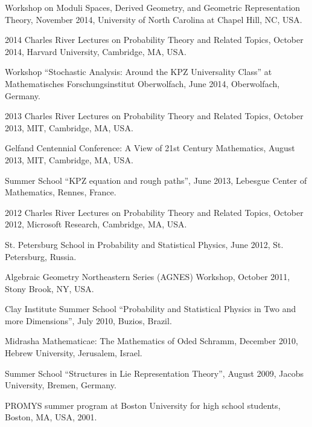 \documentclass[letterpaper,11pt]{article}
\begin{document}
\begin{etaremune}
	\item
	      Workshop on Moduli Spaces, Derived Geometry, and Geometric
	      Representation Theory, November 2014, University of North Carolina at Chapel
	      Hill, NC, USA.

	\item
	      2014 Charles River Lectures on Probability Theory and Related
	      Topics, October 2014, Harvard University, Cambridge, MA, USA.

	\item
	      Workshop ``Stochastic Analysis: Around the KPZ Universality
	      Class'' at Mathematisches Forschungsinstitut Oberwolfach, June 2014,
	      Oberwolfach, Germany.

	\item
	      2013 Charles River Lectures on Probability Theory and Related
	      Topics, October 2013, MIT, Cambridge, MA, USA.

	\item 
		Gelfand Centennial Conference:
		A View of 21st Century Mathematics, 
		August 2013, MIT, Cambridge, MA, USA.

	\item
	      Summer School ``KPZ equation and rough paths'', June 2013,
	      Lebesgue Center of Mathematics, Rennes, France.

	\item
	      2012 Charles River Lectures on Probability Theory and Related
	      Topics, October 2012, Microsoft Research, Cambridge, MA, USA.

	\item
	      St. Petersburg School in Probability and Statistical Physics,
	      June 2012, St. Petersburg, Russia.

	\item
	      Algebraic Geometry Northeastern Series (AGNES) Workshop, October
	      2011, Stony Brook, NY, USA.

	\item
	      Clay Institute Summer School ``Probability and Statistical
	      Physics in Two and more Dimensions'', July 2010, Buzios, Brazil.

	\item
	      Midrasha Mathematicae: The Mathematics of Oded Schramm, December
	      2010, Hebrew University, Jerusalem, Israel.

	\item
	      Summer School ``Structures in Lie Representation Theory'',
	      August 2009, Jacobs University, Bremen, Germany.

	\item
	      PROMYS summer program at Boston University for high school
	      students, Boston, MA, USA, 2001.
\end{etaremune}
\end{document}

